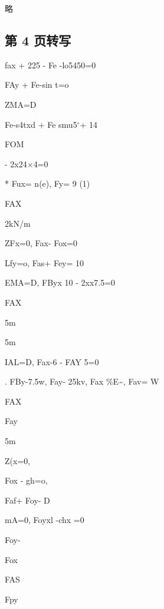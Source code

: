  略

\subsection*{第 4 页转写}
fax + 225 - Fe -lo5450=0

FAy + Fe-sin t=o

ZMA=D

Fe-s4txd + Fe smu5$^\circ$+ 14

FOM

- 2x24$\times$4=0

* Fux= n(e), Fy= 9 (1)

FAX

2kN/m

ZFx=0, Fax- Fox=0

Lfy=o, Fas+ Fey= 10

EMA=D, FByx 10 - 2xx7.5=0

FAX

5m

5m

IAL=D, Fax-6 - FAY 5=0

. FBy-7.5w, Fay- 25kv, Fax \%E\textasciitilde{}, Fav= W

FAX

Fay

5m

Z(x=0,

Fox - gh=o,

Faf+ Foy- D

mA=0, Foyxl -chx =0

Foy-

Fox

FAS

Fpy


